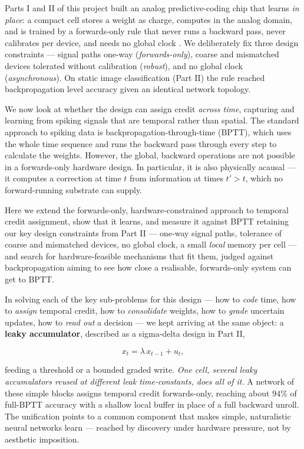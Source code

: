 \documentclass[11pt]{article}
\begin{document}
Parts I and II of this project built an analog predictive-coding chip
that learns \emph{in place}: a compact cell stores a weight as charge,
computes in the analog domain, and is trained by a forwards-only rule
that never runs a backward pass, never calibrates per device, and needs
no global clock \cite{dobney2026analog, dobney2026forwards}. We
deliberately fix three design constraints --- signal paths one-way
(\emph{forwards-only}), coarse and mismatched devices tolerated without
calibration (\emph{robust}), and no global clock (\emph{asynchronous}).
On static image classification (Part II) the rule reached
backpropagation level accuracy given an identical network topology.

We now look at whether the design can assign credit \emph{across time},
capturing and learning from spiking signals that are temporal rather
than spatial. The standard approach to spiking data is
backpropagation-through-time (BPTT), which uses the whole time sequence
and runs the backward pass through every step to calculate the weights.
However, the global, backward operations are not possible in a
forwards-only hardware design. In particular, it is also physically
acausal --- it computes a correction at time \(t\) from information at
times \(t' > t\), which no forward-running substrate can supply.

Here we extend the forwards-only, hardware-constrained approach to
temporal credit assignment, show that it learns, and measure it against
BPTT retaining our key design constraints from Part II --- one-way
signal paths, tolerance of coarse and mismatched devices, no global
clock, a small \emph{local} memory per cell --- and search for
hardware-feasible mechanisms that fit them, judged against
backpropagation aiming to see how close a realisable, forwards-only
system can get to BPTT.

In solving each of the key sub-problems for this design --- how to
\emph{code} time, how to \emph{assign} temporal credit, how to
\emph{consolidate} weights, how to \emph{grade} uncertain updates, how
to \emph{read out} a decision --- we kept arriving at the same object: a
\textbf{leaky accumulator}, described as a sigma-delta design in Part
II,

\[x_t = \lambda\, x_{t-1} + u_t,\]

feeding a threshold or a bounded graded write. \emph{One cell, several
leaky accumulators reused at different leak time-constants, does all of
it.} A network of these simple blocks assigns temporal credit
forwards-only, reaching about \(94\%\) of full-BPTT accuracy with a
shallow local buffer in place of a full backward unroll. The unification
points to a common component that makes simple, naturalistic neural
networks learn --- reached by discovery under hardware pressure, not by
aesthetic imposition.
\end{document}
